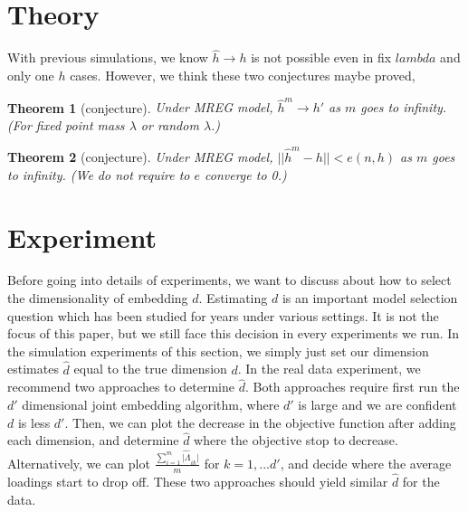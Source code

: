 \documentclass[10pt,journal,compsoc]{IEEEtran}
\newtheorem{theorem}{Theorem}[section]
\begin{document}
\section{Theory}
With previous simulations, we know $\hat{h} \rightarrow h$ is not possible even in fix $lambda$ and only one $h$ cases. However, we think these two conjectures maybe proved,
\begin{theorem}[conjecture]
Under MREG model, $\hat{h}^m \rightarrow h'$ as $m$ goes to infinity. (For fixed point mass $\lambda$ or random $\lambda$.)
\end{theorem}

\begin{theorem}[conjecture]
Under MREG model, $||\hat{h}^m - h||<e(n,h)$ as $m$ goes to infinity. (We do not require to $e$ converge to 0.) 
\end{theorem}


\section{Experiment}
Before going into details of experiments, we want to discuss about how to select the dimensionality of embedding $d$. Estimating $d$ is an important model selection question which has been studied for years under various settings. It is not the focus of this paper, but we still face this decision in every experiments we run. In the simulation experiments of this section, we simply just set our dimension estimates $\hat{d}$ equal to the true dimension $d$. In the real data experiment, we recommend two approaches to determine $\hat{d}$. Both approaches require first run the $d'$ dimensional joint embedding algorithm, where $d'$ is large and we are confident $d$ is less $d'$. Then, we can plot the decrease in the objective function after adding each dimension, and determine $\hat{d}$ where the objective stop to decrease. Alternatively, we can plot $\frac{\sum_{i=1}^{m}\hat{|\Lambda}_{ik}|}{m}$ for $k=1,...d'$, and decide where the average loadings start to drop off. These two approaches should yield similar $\hat{d}$ for the data. 
\end{document}
